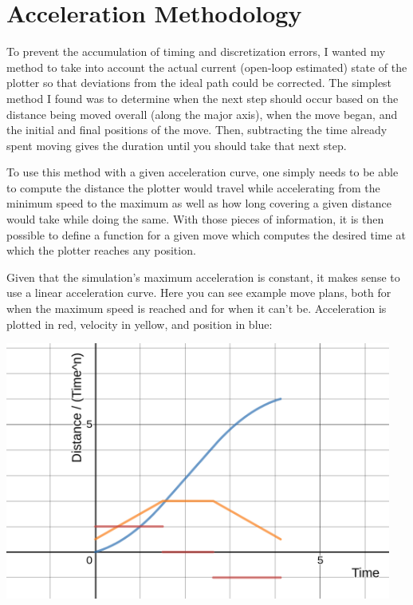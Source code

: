 \documentclass{article}
\begin{document}
\section*{Acceleration Methodology}
To prevent the accumulation of timing and discretization errors, I wanted my method to take into account the actual current (open-loop estimated) state of the plotter so that deviations from the ideal path could be corrected. The simplest method I found was to determine when the next step should occur based on the distance being moved overall (along the major axis), when the move began, and the initial and final positions of the move. Then, subtracting the time already spent moving gives the duration until you should take that next step.

To use this method with a given acceleration curve, one simply needs to be able to compute the distance the plotter would travel while accelerating from the minimum speed to the maximum as well as how long covering a given distance would take while doing the same. With those pieces of information, it is then possible to define a function for a given move which computes the desired time at which the plotter reaches any position.

Given that the simulation's maximum acceleration is constant, it makes sense to use a linear acceleration curve. Here you can see example move plans, both for when the maximum speed is reached and for when it can't be. Acceleration is plotted in red, velocity in yellow, and position in blue:

\begin{center}
  \includegraphics[width=5in]{long_move.png}
\end{center}
\end{document}

